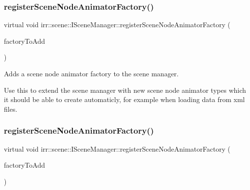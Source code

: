 \subsubsection{\texorpdfstring{register\+Scene\+Node\+Animator\+Factory()}{registerSceneNodeAnimatorFactory()}\hspace{0.1cm}{\footnotesize\ttfamily [1/2]}}
{\footnotesize\ttfamily virtual void irr\+::scene\+::\+I\+Scene\+Manager\+::register\+Scene\+Node\+Animator\+Factory (\begin{DoxyParamCaption}\item[{\hyperlink{classirr_1_1scene_1_1ISceneNodeAnimatorFactory}{I\+Scene\+Node\+Animator\+Factory} $\ast$}]{factory\+To\+Add }\end{DoxyParamCaption})\hspace{0.3cm}{\ttfamily [pure virtual]}}



Adds a scene node animator factory to the scene manager. 

Use this to extend the scene manager with new scene node animator types which it should be able to create automaticly, for example when loading data from xml files. \mbox{\label{classirr_1_1scene_1_1ISceneManager_af48c93cc41f986f08ed964cc575ee7a0}} 
\subsubsection{\texorpdfstring{register\+Scene\+Node\+Animator\+Factory()}{registerSceneNodeAnimatorFactory()}\hspace{0.1cm}{\footnotesize\ttfamily [2/2]}}
{\footnotesize\ttfamily virtual void irr\+::scene\+::\+I\+Scene\+Manager\+::register\+Scene\+Node\+Animator\+Factory (\begin{DoxyParamCaption}\item[{\hyperlink{classirr_1_1scene_1_1ISceneNodeAnimatorFactory}{I\+Scene\+Node\+Animator\+Factory} $\ast$}]{factory\+To\+Add }\end{DoxyParamCaption})\hspace{0.3cm}{\ttfamily [pure virtual]}}



